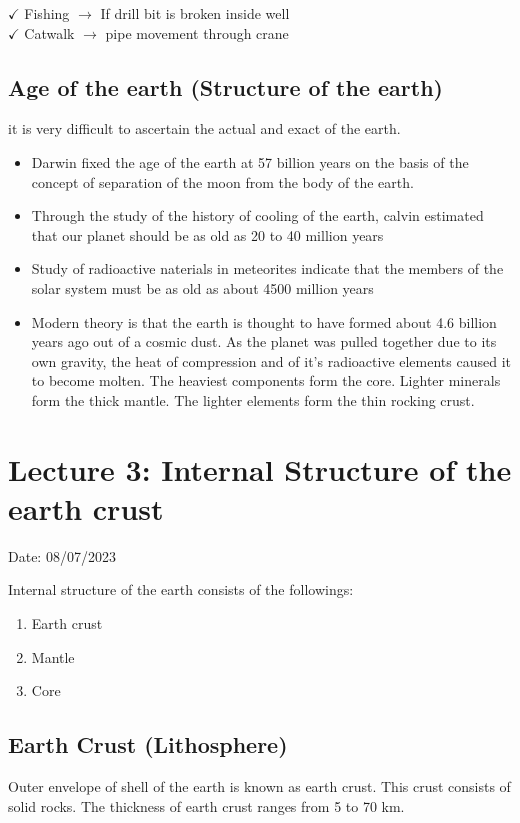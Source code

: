 \documentclass{article}
\begin{document}
$\checkmark$ Fishing $\rightarrow$ If drill bit is broken inside well \\
$\checkmark$ Catwalk $\rightarrow$ pipe movement through crane 

\subsection*{Age of the earth (Structure of the earth)}
it is very difficult to ascertain the actual and exact of the earth. 
\begin{itemize}
  \item Darwin fixed the age of the earth at 57 billion years on the basis of the concept of separation of the moon from the body of the earth.
  \item Through the study of the history of cooling of the earth, calvin estimated that our planet should be as old as 20 to 40 million years 
  \item Study of radioactive naterials in meteorites indicate that the members of the solar system must be as old as about 4500 million years 
  \item Modern theory is that the earth is thought to have formed about 4.6 billion years ago out of a cosmic dust. As the planet was pulled together due to its own gravity, the heat of compression and of it's radioactive elements caused it to become molten. The heaviest components form the core. Lighter minerals form the thick mantle. The lighter elements form the thin rocking crust. 
\end{itemize}


\section{Lecture 3: Internal Structure of the earth crust}
\hfill Date: 08/07/2023 

Internal structure of the earth consists of the followings:
\begin{enumerate}
  \item Earth crust 
  \item Mantle 
  \item Core 
\end{enumerate}

\subsection*{Earth Crust (Lithosphere)}
Outer envelope of shell of the earth is known as earth crust. This crust consists of solid rocks. The thickness of earth crust ranges from 5 to 70 km.
\end{document}
